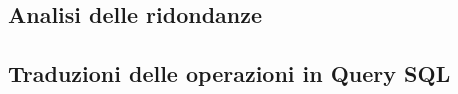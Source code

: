 \documentclass{article}
\begin{document}
\subsection{Analisi delle ridondanze}

\subsection{Traduzioni delle operazioni in Query SQL}


% 

% 
\end{document}
